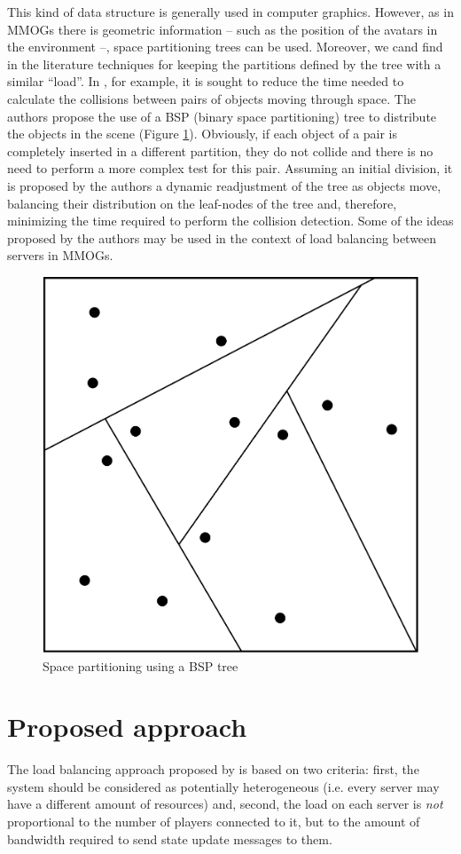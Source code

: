 This kind of data structure is generally used in computer graphics. However, as in MMOGs there is geometric information -- such as the position of the avatars in the environment --, space partitioning trees can be used. Moreover, we cand find in the literature techniques for keeping the partitions defined by the tree with a similar ``load''. In \cite{luque2005bpc}, for example, it is sought to reduce the time needed to calculate the collisions between pairs of objects moving through space. The authors propose the use of a BSP (binary space partitioning) tree to distribute the objects in the scene (Figure \ref{fig:bsp}). Obviously, if each object of a pair is completely inserted in a different partition, they do not collide and there is no need to perform a more complex test for this pair. Assuming an initial division, it is proposed by the authors a dynamic readjustment of the tree as objects move, balancing their distribution on the leaf-nodes of the tree and, therefore, minimizing the time required to perform the collision detection. Some of the ideas proposed by the authors may be used in the context of load balancing between servers in MMOGs.

\begin{figure}[!t]
	\centering
	\includegraphics[width=0.5\linewidth]{images/bsp}
	\caption{Space partitioning using a BSP tree}
	\label{fig:bsp}
\end{figure}



\section{Proposed approach}
\label{sec:proposal}

The load balancing approach proposed by \cite{bezerra2009fgl} is based on two criteria: first, the system should be considered as potentially heterogeneous (i.e. every server may have a different amount of resources) and, second, the load on each server is \emph{not} proportional to the number of players connected to it, but to the amount of bandwidth required to send state update messages to them.

